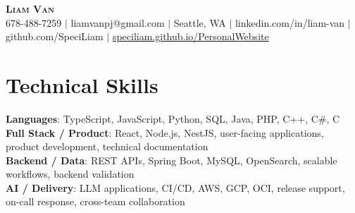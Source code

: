 \documentclass[letterpaper,11pt]{article}
\begin{document}

%
\begin{center}
    \textbf{\Huge \scshape Liam Van} \\ \vspace{1pt}
    \small 678-488-7259 $|$ \small {liamvanpj@gmail.com} $|$ Seattle, WA
 {{$|$ linkedin.com/in/liam-van} {$|$ github.com/SpeciLiam} {$|$ \href{https://speciliam.github.io/PersonalWebsite}{speciliam.github.io/PersonalWebsite}}}

\end{center}

\section{Technical Skills}
 \begin{itemize}[leftmargin=0.15in, label={}]
    \small{\item{
     \textbf{Languages}{: TypeScript, JavaScript, Python, SQL, Java, PHP, C++, C\#, C} \\
     \textbf{Full Stack / Product}{: React, Node.js, NestJS, user-facing applications, product development, technical documentation} \\
     \textbf{Backend / Data}{: REST APIs, Spring Boot, MySQL, OpenSearch, scalable workflows, backend validation} \\
     \textbf{AI / Delivery}{: LLM applications, CI/CD, AWS, GCP, OCI, release support, on-call response, cross-team collaboration} \\
    }}
 \end{itemize}
%
\end{document}
